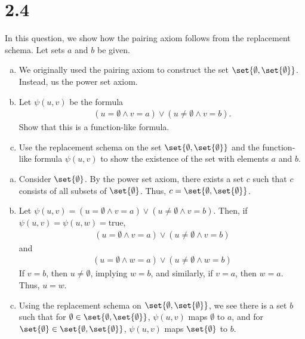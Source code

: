 \documentclass[10pt]{mypackage}
\begin{document}
\section{2.4}%
\begin{problem}
  In this question, we show how the pairing axiom follows from the replacement schema. Let sets $a$ and $b$ be given.
  \begin{enumerate}[(a)]
    \item We originally used the pairing axiom to construct the set $\set{\emptyset,\set{\emptyset}}$. Instead, us the power set axiom.
    \item Let $\psi(u,v)$ be the formula
      \begin{align*}
        \left(u=\emptyset \wedge v = a\right)\vee \left(u \neq \emptyset \wedge v = b\right).
      \end{align*}
      Show that this is a function-like formula.
    \item Use the replacement schema on the set $\set{\emptyset,\set{\emptyset}}$ and the function-like formula $\psi\left(u,v\right)$ to show the existence of the set with elements $a$ and $b$.
  \end{enumerate}
\end{problem}
\begin{solution}\hfill
  \begin{enumerate}[(a)]
    \item Consider $\set{\emptyset}$. By the power set axiom, there exists a set $c$ such that $c$ consists of all subsets of $\set{\emptyset}$. Thus, $c = \set{\emptyset,\set{\emptyset}}$.
    \item Let $\psi(u,v) = \left(u = \emptyset \wedge v = a\right)\vee \left(u\neq\emptyset \wedge v = b\right)$. Then, if $\psi\left(u,v\right) = \psi\left(u,w\right) = \text{true}$,
      \begin{align*}
        \left(u = \emptyset \wedge v = a\right) \vee \left(u\neq \emptyset \wedge v = b\right)
      \end{align*}
      and
      \begin{align*}
        \left(u = \emptyset \wedge w = a\right) \vee \left(u\neq \emptyset \wedge w = b\right)
      \end{align*}
      If $v = b$, then $u \neq \emptyset$, implying $w = b$, and similarly, if $v = a$, then $w = a$. Thus, $u = w$.
    \item Using the replacement schema on $\set{\emptyset,\set{\emptyset}}$, we see there is a set $b$ such that for $\emptyset\in \set{\emptyset,\set{\emptyset}}$, $\psi(u,v)$ maps $\emptyset$ to $a$, and for $\set{\emptyset} \in \set{\emptyset,\set{\emptyset}}$, $\psi(u,v)$ maps $\set{\emptyset}$ to $b$.
  \end{enumerate}
\end{solution}
\end{document}
